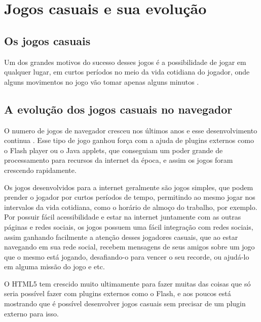 \section{Jogos casuais e sua evolução}

\subsection{Os jogos casuais}
Um dos grandes motivos do sucesso desses jogos é a possibilidade de
jogar em qualquer lugar, em curtos períodos no meio da vida cotidiana
do jogador, onde alguns movimentos no jogo vão tomar apenas alguns
minutos \cite{ozcan2010recent}.

\subsection{A evolução dos jogos casuais no navegador}
O numero de jogos de navegador cresceu nos últimos anos e esse
desenvolvimento continua \cite{ozcan2010recent}. Esse tipo de jogo
ganhou força com a ajuda de plugins externos como o Flash player ou
o Java applets, que conseguiam um poder grande de processamento para
recursos da internet da época, e assim os jogos foram crescendo rapidamente.

Os jogos desenvolvidos para a internet geralmente são jogos simples,
que podem prender o jogador por curtos períodos de tempo, permitindo
ao mesmo jogar nos intervalos da vida cotidiana, como o horário de almoço
do trabalho, por exemplo.
Por possuir fácil acessibilidade e estar na internet juntamente com as
outras páginas e redes sociais, os jogos possuem uma fácil integração
com redes sociais, assim ganhando facilmente a atenção desses
jogadores casuais, que ao estar navegando em sua rede social, recebem
mensagens de seus amigos sobre um jogo que o mesmo está jogando,
desafiando-o para vencer o seu recorde, ou ajudá-lo em alguma missão
do jogo e etc.

O HTML5 tem crescido muito ultimamente para fazer muitas das coisas
que só seria possível fazer com plugins externos como o Flash, e aos
poucos está mostrando que é possível desenvolver jogos casuais sem
precisar de um plugin externo para isso.
